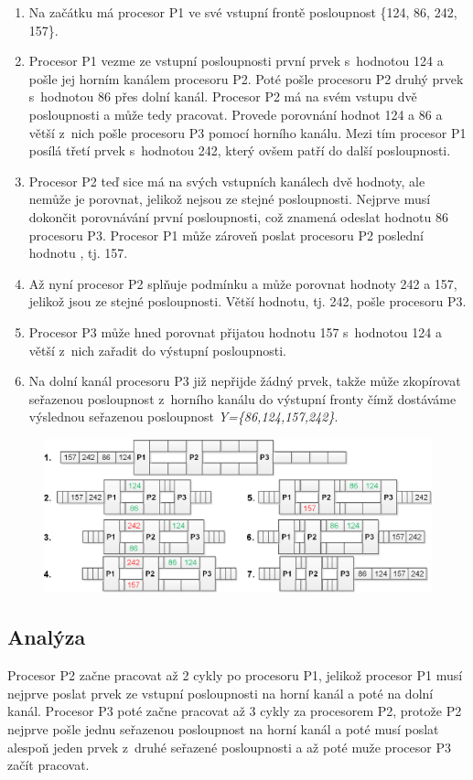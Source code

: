 \documentclass[10pt,a4paper,notitlepage]{article}
\begin{document}
\begin{enumerate}
  \item Na začátku má procesor P1 ve své vstupní frontě posloupnost \{124, 86, 242, 157\}.
  \item Procesor P1 vezme ze vstupní posloupnosti první prvek s~hodnotou 124 a pošle jej
    horním kanálem procesoru P2. Poté pošle procesoru P2 druhý prvek s~hodnotou 86 přes
    dolní kanál.  Procesor P2 má na svém vstupu dvě posloupnosti a může tedy
    pracovat. Provede porovnání hodnot 124 a 86 a větší z~nich pošle procesoru
    P3 pomocí horního kanálu. Mezi tím procesor P1 posílá třetí prvek s~hodnotou 242,
    který ovšem patří do další posloupnosti.
  \item Procesor P2 teď sice má na svých vstupních kanálech dvě hodnoty, ale
    nemůže je porovnat, jelikož nejsou ze stejné posloupnosti. Nejprve musí
    dokončit porovnávání první posloupnosti, což znamená odeslat hodnotu 86
    procesoru P3.  Procesor P1 může zároveň poslat procesoru P2 poslední hodnotu
    , tj. 157.
  \item Až nyní procesor P2 splňuje podmínku a může porovnat hodnoty 242 a 157,
    jelikož jsou ze stejné posloupnosti. Větší hodnotu, tj. 242, pošle procesoru P3.
  \item Procesor P3 může hned porovnat přijatou hodnotu 157 s~hodnotou 124 a
    větší z~nich zařadit do výstupní posloupnosti.
  \item Na dolní kanál procesoru P3 již nepřijde žádný prvek, takže může
    zkopírovat seřazenou posloupnost z~horního kanálu do výstupní fronty čímž
    dostáváme výslednou seřazenou posloupnost \textit{Y=\{86,124,157,242\}}.
\end{enumerate}

\begin{figure}[h]
	\centering
	\includegraphics{prl-pms.eps}
  \label{pic:2}
\end{figure}

\subsection{Analýza}\label{analyza}
Procesor P2 začne pracovat až 2 cykly po procesoru P1, jelikož procesor P1 musí
nejprve poslat prvek ze vstupní posloupnosti na horní kanál a poté na dolní
kanál. Procesor P3 poté začne pracovat až 3 cykly za procesorem P2, protože P2
nejprve pošle jednu seřazenou posloupnost na horní kanál a poté musí poslat
alespoň jeden prvek z~druhé seřazené posloupnosti a až poté muže procesor P3
začít pracovat.
\end{document}
